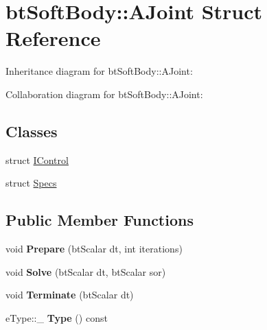 \hypertarget{structbt_soft_body_1_1_a_joint}{\section{bt\+Soft\+Body\+:\+:A\+Joint Struct Reference}
\label{structbt_soft_body_1_1_a_joint}
}


Inheritance diagram for bt\+Soft\+Body\+:\+:A\+Joint\+:


Collaboration diagram for bt\+Soft\+Body\+:\+:A\+Joint\+:
\subsection*{Classes}
\begin{DoxyCompactItemize}
\item 
struct \hyperlink{structbt_soft_body_1_1_a_joint_1_1_i_control}{I\+Control}
\item 
struct \hyperlink{structbt_soft_body_1_1_a_joint_1_1_specs}{Specs}
\end{DoxyCompactItemize}
\subsection*{Public Member Functions}
\begin{DoxyCompactItemize}
\item 
\hypertarget{structbt_soft_body_1_1_a_joint_a43fe2375c81f89ba8a0090f4561bed43}{void {\bfseries Prepare} (bt\+Scalar dt, int iterations)}\label{structbt_soft_body_1_1_a_joint_a43fe2375c81f89ba8a0090f4561bed43}

\item 
\hypertarget{structbt_soft_body_1_1_a_joint_a9c0981fa66ca3998f6a9ed3c221b496b}{void {\bfseries Solve} (bt\+Scalar dt, bt\+Scalar sor)}\label{structbt_soft_body_1_1_a_joint_a9c0981fa66ca3998f6a9ed3c221b496b}

\item 
\hypertarget{structbt_soft_body_1_1_a_joint_adc2443dc9477a4c90c1597c3dc86e04a}{void {\bfseries Terminate} (bt\+Scalar dt)}\label{structbt_soft_body_1_1_a_joint_adc2443dc9477a4c90c1597c3dc86e04a}

\item 
\hypertarget{structbt_soft_body_1_1_a_joint_a5ddfd19dbdb2a3db19344a26142eb97c}{e\+Type\+::\+\_\+ {\bfseries Type} () const }\label{structbt_soft_body_1_1_a_joint_a5ddfd19dbdb2a3db19344a26142eb97c}

\end{DoxyCompactItemize}
